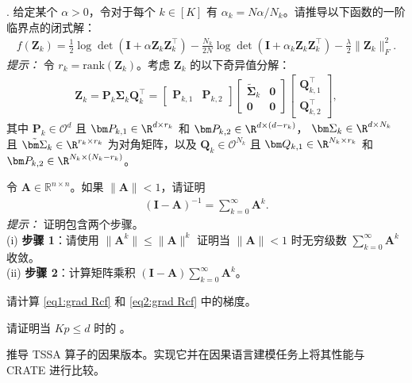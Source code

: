 \documentclass[../../book-main_zh.tex]{subfiles}
\begin{document}
\begin{exercise}
    . 给定某个 $\alpha >0$，令对于每个 $k \in [K]$ 有 $\alpha_k=N\alpha/N_k$。请推导以下函数的一阶临界点的闭式解：
    \begin{align*}
        f(\bm Z_k) = \frac{1}{2}\log\det\left(\bm I + \alpha\bm
        Z_k\bm Z_k^\top \right) - \frac{N_k}{2N}\log\det\left(\bm I +
        \alpha_k \bm Z_k\bm Z_k^\top \right) - \frac{\lambda}{2}\|\bm Z_k\|_F^2.
    \end{align*}
    {\em 提示：} 令 $r_k=\mathrm{rank}(\bm Z_k)$。考虑 $\bm Z_k$ 的以下奇异值分解：
    \begin{align*}
        \bm Z_k = \bm P_k\bm \Sigma_k\bm Q_k^\top =
        \begin{bmatrix}
            \bm P_{k,1} & \bm P_{k,2}
        \end{bmatrix}
        \begin{bmatrix}
            \tilde{\bm \Sigma}_{k} & \bm 0 \\
            \bm 0 & \bm 0
        \end{bmatrix}
        \begin{bmatrix}
            \bm Q_{k,1}^\top \\ \bm Q_{k,2}^\top
        \end{bmatrix},
    \end{align*}
    其中 $\bm P_k \in \mathcal{O}^d$ 且 $\bm P_{k,1} \in
    \R^{d\times r_k}$ 和  $\bm P_{k,2} \in \R^{d\times (d-r_k)}$，
    $\bm \Sigma_k \in \R^{d\times N_k}$ 且 $\tilde{\bm \Sigma}_{k}
    \in \R^{r_k\times r_k}$ 为对角矩阵，以及  $\bm Q_k
    \in \mathcal{O}^{N_k}$ 且 $\bm Q_{k,1} \in \R^{N_k\times r_k}$
    和  $\bm P_{k,2} \in \R^{N_k \times (N_k-r_k)}$。
    \medskip

\end{exercise}

\begin{exercise}[矩阵求逆的诺伊曼级数]\label{ex:neumannn}
    令 $\bm A \in \mathbb{R}^{n\times n}$。如果 $\|\bm A\| < 1$，请证明
    \begin{align}\label{eq:neumann}
        \left( \bm I - \bm A\right)^{-1} = \sum_{k=0}^\infty \bm A^k.
    \end{align}
    {\em 提示：} 证明包含两个步骤。 \\
    (i) {\bf 步骤 1}：请使用 $\|\bm A^k\| \le \|\bm A\|^k$ 证明当 $\|\bm A\| < 1$ 时无穷级数
    $\sum_{k=0}^\infty \bm A^k$ 收敛。 \\
    (ii) {\bf 步骤 2}：计算矩阵乘积 $(\bm I - \bm A)
    \sum_{k=0}^\infty \bm A^k$。
\end{exercise}

\begin{exercise}
    请计算 \eqref{eq1:grad Rcf} 和 \eqref{eq2:grad Rcf} 中的梯度。
\end{exercise}

\begin{exercise}
    请证明当 $Kp \le d$ 时的 。
\end{exercise}

\begin{exercise}
    推导 TSSA 算子的因果版本。实现它并在因果语言建模任务上将其性能与 CRATE 进行比较。
\end{exercise}
\end{document}
